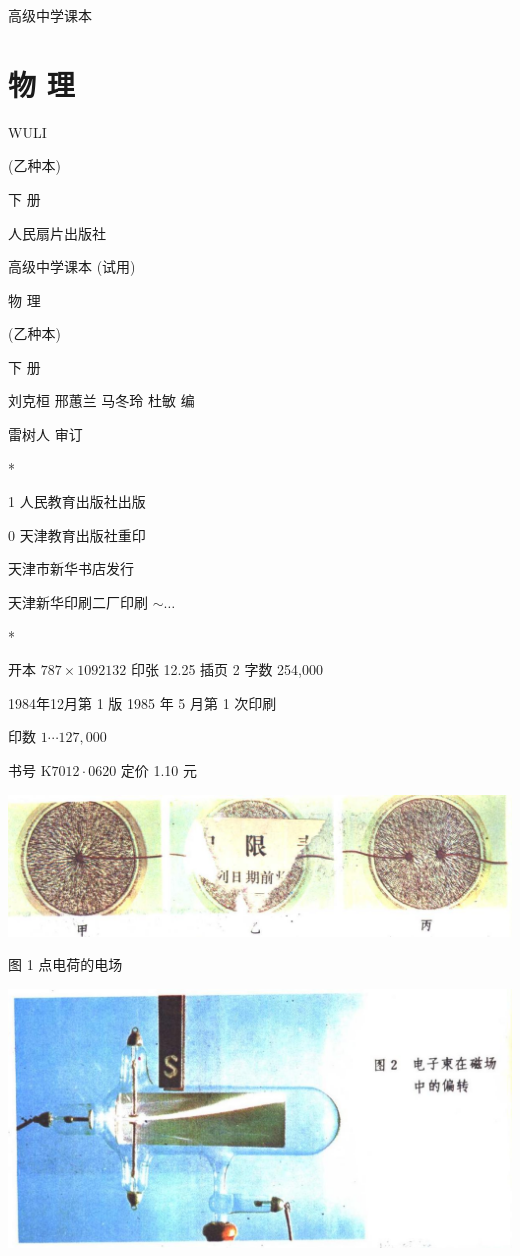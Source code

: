 \documentclass[10pt]{article}
\begin{document}
高级中学课本

\section*{物 理}

WULI

(乙种本)

下 册

人民扇片出版社

高级中学课本 (试用)

物 理

(乙种本)

下 册

刘克桓 邢蕙兰 马冬玲 杜敏 编

雷树人 审订

*

1 人民教育出版社出版

0 天津教育出版社重印

天津市新华书店发行

天津新华印刷二厂印刷 \(\sim \ldots\)

*

开本 \({787} \times {1092132}\) 印张 12.25 插页 2 字数 254,000

1984年12月第 1 版 1985 年 5 月第 1 次印刷

印数 \(1\cdots {127},{000}\)

书号 \(\mathrm{K}{7012} \cdot {0620}\) 定价 1.10 元

\begin{center}
\includegraphics[max width=1.0\textwidth]{images/01913056-1f15-74d8-9184-9aab52c9d66b_3_802007.jpg}
\end{center}

图 1 点电荷的电场

\begin{center}
\includegraphics[max width=1.0\textwidth]{images/01913056-1f15-74d8-9184-9aab52c9d66b_3_778936.jpg}
\end{center}
\end{document}
